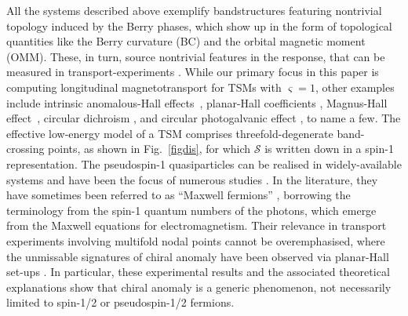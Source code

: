 \documentclass[aps,prb,onecolumn,nofootinbib,citeautoscript,10pt]{revtex4-2}
\begin{document}
All the systems described above exemplify bandstructures featuring nontrivial topology \cite{xiao_review, sundaram99_wavepacket, graf-Nband} induced by the Berry phases, which show up in the form of topological quantities like the Berry curvature (BC) and the orbital magnetic moment (OMM). These, in turn, source nontrivial features in the response, that can be measured in transport-experiments \cite{timm, ips_rahul_ph_strain,rahul-jpcm, ips-kush-review, claudia-multifold, ips-ruiz, ips-rsw-ph, ips-tilted, ips-shreya}. While our primary focus in this paper is computing longitudinal magnetotransport for TSMs with $ \varsigma = 1$, other examples include intrinsic anomalous-Hall effects~\cite{haldane04_berry,goswami13_axionic, burkov14_anomolous}, planar-Hall coefficients \cite{zhang16_linear, chen16_thermoelectric, nandy_2017_chiral, nandy18_Berry, amit_magneto, ips-floquet,  das20_thermal, das22_nonlinear, pal22a_berry, pal22b_berry, fu22_thermoelectric, araki20_magnetic, mizuta14_contribution, ips_rahul_ph_strain, timm, rahul-jpcm, ips-kush-review, claudia-multifold, ips-ruiz, lei_li-ph, ips-tilted, ips-rsw-ph, ips-shreya, ips-spin1-ph, ips-nl-ph, gusynin06_magneto, staalhammar20_magneto, yadav23_magneto}, Magnus-Hall effect~\cite{papaj_magnus, amit-magnus, ips-magnus}, circular dichroism \cite{ips-cd1, ips_cd}, and circular photogalvanic effect \cite{moore18_optical, guo23_light,kozii, ips_cpge}, to name a few.
The effective low-energy model of a TSM comprises threefold-degenerate band-crossing points, as shown in Fig.~\ref{figdis}, for which $ \boldsymbol  {\mathcal S } $ is written down in a spin-1 representation. The pseudospin-1 quasiparticles can be realised in widely-available systems and have been the focus of numerous studies \cite{optical_lat1, optical_lat2, cold-atom, lv, spin13d1, spin13d2, spin13d3, spin13d4, shen,lan, urban, peng-he, lai, ips3by2, krish-spin1, ips-cd1, bitan-spin1, pal22b_berry, ips-abs-spin1, ips-spin1-ph}. In the literature, they have sometimes been referred to as ``Maxwell fermions'' \cite{cold-atom}, borrowing the terminology from the spin-1 quantum numbers of the photons, which emerge from the Maxwell equations for electromagnetism. Their relevance in transport experiments involving multifold nodal points cannot be overemphasised, where the unmissable signatures of chiral anomaly have been observed via planar-Hall set-ups \cite{claudia-multifold}. In particular, these experimental results and the associated theoretical explanations show that chiral anomaly is a generic phenomenon, not necessarily limited to spin-1/2 or pseudospin-1/2 fermions.
\end{document}
